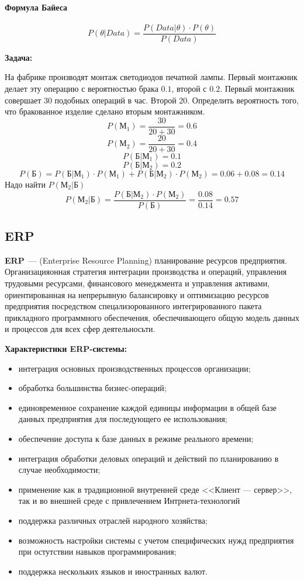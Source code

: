 \newpage

\paragraph{Формула Байеса}\mbox{}\par
\[
  P(\theta | Data) = \frac{P(Data | \theta) \cdot P(\theta)}{P(Data)}
\] 

\textbf{Задача:}\par
На фабрике производят монтаж светодиодов печатной лампы. Первый монтажник делает
эту операцию с вероятностью брака $0.1$, второй с $0.2$. Первый монтажник
совершает 30 подобных операций в час. Второй 20. Определить вероятность того,
что бракованное изделие сделано вторым монтажником.
\[
  P(М_1) = \frac{30}{20+30} = 0.6
\] 
\[
  P(М_2) = \frac{20}{20+30} = 0.4
\] 
\[
  P(Б | М_1) = 0.1
\] 
\[
  P(Б | М_2) = 0.2
\] 
\[
  P(Б) = P(Б | М_1) \cdot P(М_1) + P(Б | М_2) \cdot P(М_2) = 0.06 + 0.08 = 0.14
\] 
Надо найти $P(М_2 | Б)$
\[
  P(М_2 | Б) = \frac{P(Б | М_2) \cdot P(М_2)}{P(Б)} = \frac{0.08}{0.14} = 0.57
\] 

\subsection{ERP}
\textbf{ERP}~--- (Enterprise Resource Planning) планирование ресурсов
предприятия. Организацияонная стратегия интеграции производства и операций,
управления трудовыми ресурсами, финансового менеджмента и управления активами,
ориентированная на непрерывную балансировку и оптимизацию ресурсов предприятия
посредством спецализорованного интегрированного пакета прикладного программного
обеспечения, обеспечивающего общую модель данных и процессов для всех сфер
деятельносьти.

\textbf{Характеристики ERP-системы:}
\begin{itemize}
  \item интеграция основных производственных процессов организации;
  \item обработка большинства бизнес-операций;
  \item единовременное сохранение каждой единицы информации в общей базе данных
    предприятия для последующего ее использования;
  \item обеспечение доступа к базе данных в режиме реального времени;
  \item интеграция обработки деловых операций и действий по планированию в
    случае необходимости;
  \item применение как в традиционной внутренней среде <<Клиент --- сервер>>,
    так и во внешней среде с привлечением Интрнета-технологий
  \item поддержка различных отраслей народного хозяйства;
  \item возможность настройки системы с учетом специфических нужд предприятия
    при остутствии навыков программирования;
  \item поддержка нескольких языков и иностранных валют.
\end{itemize}

